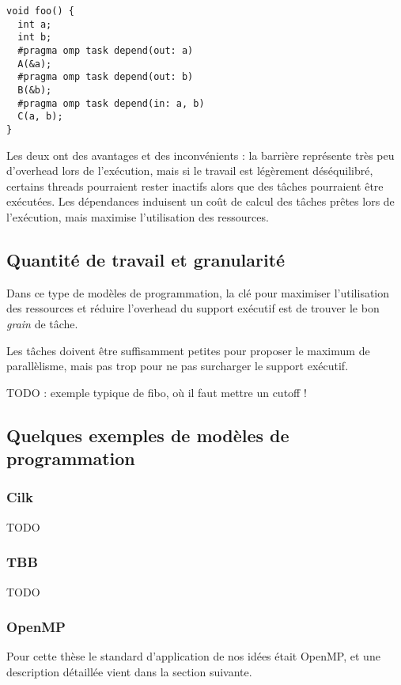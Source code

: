 \begin{lstlisting}[caption=Synchronisation via des dépendances,label=lst:context:task-dep]
void foo() {
  int a;
  int b;
  #pragma omp task depend(out: a)
  A(&a);
  #pragma omp task depend(out: b)
  B(&b);
  #pragma omp task depend(in: a, b)
  C(a, b);
}
\end{lstlisting}

Les deux ont des avantages et des inconvénients : la barrière représente très peu d'overhead lors de l'exécution, mais si le travail est légèrement déséquilibré, certains threads pourraient rester inactifs alors que des tâches pourraient être exécutées.
Les dépendances induisent un coût de calcul des tâches prêtes lors de l'exécution, mais maximise l'utilisation des ressources.

\subsection{Quantité de travail et granularité}

Dans ce type de modèles de programmation, la clé pour maximiser l'utilisation des ressources et réduire l'overhead du support exécutif est de trouver le bon \emph{grain} de tâche.

Les tâches doivent être suffisamment petites pour proposer le maximum de parallèlisme, mais pas trop pour ne pas surcharger le support exécutif.

TODO : exemple typique de fibo, où il faut mettre un cutoff !


\subsection{Quelques exemples de modèles de programmation}


\subsubsection{Cilk}

TODO

\subsubsection{TBB}

TODO

\subsubsection{OpenMP}

Pour cette thèse le standard d'application de nos idées était OpenMP, et une description détaillée vient dans la section suivante.

